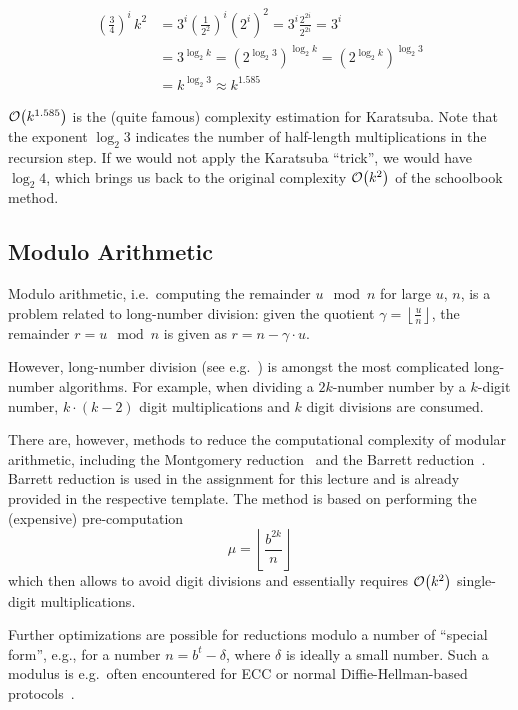 \begin{align}
\left(\frac{3}{4}\right)^i\,k^2 &= 3^i \left(\frac{1}{2^2}\right)^i \left(2^i\right)^2  = 3^i \frac{2^{2i}}{2^{2i}} = 3^i \nonumber\\
&= 3^{\log_2 k} = \left(2^{\log_2 3} \right)^{\log_2 k} = \left(2^{\log_2 k} \right)^{\log_2 3} \nonumber \\
&= k^{\log_2 3} \approx k^{1.585} \nonumber
\end{align}

$\mathcal{O}{\left(k^{1.585}\right)}$ is the (quite famous) complexity estimation for Karatsuba. Note that the exponent $\log_2 3$ indicates the number of half-length multiplications in the recursion step. If we would not apply the Karatsuba ``trick'', we would have $\log_2 4$, which brings us back to the original complexity $\mathcal{O}{\left(k^{2}\right)}$ of the schoolbook method.


\subsection{Modulo Arithmetic} 
Modulo arithmetic, i.e.~computing the remainder $u \mod n$ for large $u$, $n$, is a problem related to long-number division: given the quotient $\gamma = \left\lfloor \frac{u}{n} \right\rfloor$, the remainder $r = u \mod n$ is given as $r = n - \gamma \cdot u$.

However, long-number division (see e.g.~\cite[14.2.5]{menezes96handbook}) is amongst the most complicated long-number algorithms. For example, when dividing a $2k$-number number by a $k$-digit number, $k \cdot \left(k - 2\right)$ digit multiplications and $k$ digit divisions are consumed.

There are, however, methods to reduce the computational complexity of modular arithmetic, including the Montgomery reduction~\cite[14.3.2]{menezes96handbook} and the Barrett reduction~\cite[14.3.3]{menezes96handbook}. Barrett reduction is used in the assignment for this lecture and is already provided in the respective template. The method is based on performing the (expensive) pre-computation
$$
\mu = \left\lfloor \frac{b^{2k}}{n} \right\rfloor
$$
which then allows to avoid digit divisions and essentially requires $\mathcal{O}{\left( k^2\right)}$ single-digit multiplications.

Further optimizations are possible for reductions modulo a number of ``special form'', e.g., for a number $n = b^t - \delta$, where $\delta$ is ideally a small number. Such a modulus is e.g.~often encountered for \ac{ECC} or normal Diffie-Hellman-based protocols~\cite[14.3.4]{menezes96handbook}.

